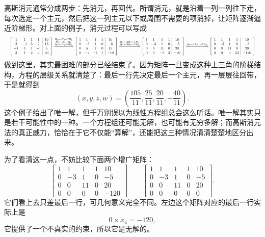 \documentclass[UTF8]{ctexbook}
\newcommand{\R}{\mathbb{R}}
\begin{document}
高斯消元通常分成两步：先消元，再回代。所谓消元，就是沿着一列一列往下走，每次选定一个主元，然后把这一列主元以下或周围不需要的项消掉，让矩阵逐渐逼近阶梯形。对上面的例子，消元过程可以写成
\[
\resizebox{\textwidth}{!}{$
\left[
\begin{array}{cccc|c}
1&1&1&1&10\\
2&-1&3&2&15\\
-1&4&1&-1&5\\
3&1&2&4&20
\end{array}
\right]
\xrightarrow{\substack{R_2\leftarrow R_2-2R_1\\R_3\leftarrow R_3+R_1\\R_4\leftarrow R_4-3R_1}}
\left[
\begin{array}{cccc|c}
1&1&1&1&10\\
0&-3&1&0&-5\\
0&5&2&0&15\\
0&-2&-1&1&-10
\end{array}
\right]
\xrightarrow{\substack{R_3\leftarrow 3R_3+5R_2\\R_4\leftarrow 3R_4-2R_2}}
\left[
\begin{array}{cccc|c}
1&1&1&1&10\\
0&-3&1&0&-5\\
0&0&11&0&20\\
0&0&-5&3&-20
\end{array}
\right]
\xrightarrow{R_4\leftarrow 11R_4+5R_3}
\left[
\begin{array}{cccc|c}
1&1&1&1&10\\
0&-3&1&0&-5\\
0&0&11&0&20\\
0&0&0&33&-120
\end{array}
\right]
$}
\]
做到这里，其实最困难的部分已经结束了。因为矩阵一旦变成这种上三角的阶梯结构，方程的层级关系就清楚了：最后一行先决定最后一个主元，再一层层往回带，于是就得到
\[
\left(x,y,z,w\right)=\left(\frac{105}{11},\frac{25}{11},\frac{20}{11},-\frac{40}{11}\right).
\]
这个例子给出了唯一解，但千万别误以为线性方程组总会这么听话。唯一解其实只是若干可能性中的一种。一个方程组还可能无解，也可能有无穷多解；而高斯消元法的真正威力，恰恰在于它不仅能“算解”，还能把这三种情况清清楚楚地区分出来。

为了看清这一点，不妨比较下面两个增广矩阵：
\[
\left[
\begin{array}{cccc|c}
1&1&1&1&10\\
0&-3&1&0&-5\\
0&0&11&0&20\\
0&0&0&0&-120
\end{array}
\right]
\qquad
\left[
\begin{array}{cccc|c}
1&1&1&1&10\\
0&-3&1&0&-5\\
0&0&11&0&20\\
0&0&0&0&0
\end{array}
\right].
\]
它们看上去只差最后一行，可几何意义完全不同。左边这个矩阵对应的最后一行实际上是
\[
0 \times x_4=-120,
\]
它提供了一个不真实的约束，所以它是无解的。
\end{document}

